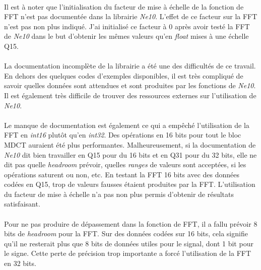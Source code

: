 \documentclass{article}
\begin{document}
    \paragraph{}
    Il est à noter que l'initialisation du facteur de mise à échelle de la fonction de FFT n'est pas documentée dans la librairie \emph{Ne10}. L'effet de ce facteur sur la FFT n'est pas non plus indiqué. J'ai initialisé ce facteur à 0 après avoir testé la FFT de \emph{Ne10} dans le but d'obtenir les mêmes valeurs qu'en \emph{float} mises à une échelle Q15.

    \paragraph{}
    La documentation incomplète de la librairie a été une des difficultés de ce travail. En dehors des quelques codes d'exemples disponibles, il est très compliqué de savoir quelles données sont attendues et sont produites par les fonctions de \emph{Ne10}. Il est également très difficile de trouver des ressources externes sur l'utilisation de \emph{Ne10}.

    \paragraph{}
    Le manque de documentation est également ce qui a empêché l'utilisation de la FFT en \emph{int16} plutôt qu'en \emph{int32}. Des opérations en 16 bits pour tout le bloc MDCT auraient été plus performantes. Malheureusement, si la documentation de \emph{Ne10} dit bien travailler en Q15 pour du 16 bits et en Q31 pour du 32 bits, elle ne dit pas quelle \emph{headroom} prévoir, quelles \emph{ranges} de valeurs sont acceptées, si les opérations saturent ou non, etc. En testant la FFT 16 bits avec des données codées en Q15, trop de valeurs fausses étaient produites par la FFT. L'utilisation du facteur de mise à échelle n'a pas non plus permis d'obtenir de résultats satisfaisant.

    \paragraph{}
    Pour ne pas produire de dépassement dans la fonction de FFT, il a fallu prévoir 8 bits de \emph{headroom} pour la FFT. Sur des données codées sur 16 bits, cela signifie qu'il ne resterait plus que 8 bits de données utiles pour le signal, dont 1 bit pour le signe. Cette perte de précision trop importante a forcé l'utilisation de la FFT en 32 bits.
\end{document}
